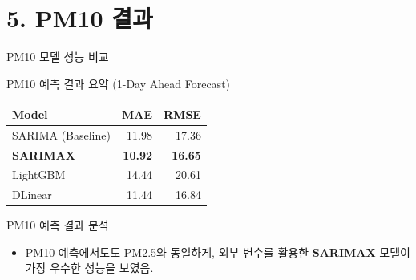 \documentclass[serif, aspectratio=169]{beamer}
\begin{document}
\section{5. PM10 결과}
\begin{frame}{PM10 모델 성능 비교}
    \begin{block}{\small PM10 예측 결과 요약 (1-Day Ahead Forecast)}
        \begin{center}
        \scriptsize
        \begin{tabular}{lrr}
        \toprule
        \textbf{Model} & \textbf{MAE} & \textbf{RMSE} \\
        \midrule
        SARIMA (Baseline) & 11.98 & 17.36 \\
        \textbf{SARIMAX} & \textbf{10.92} & \textbf{16.65} \\
        LightGBM & 14.44 & 20.61 \\
        DLinear & 11.44 & 16.84 \\
        \bottomrule
        \end{tabular}
        \end{center}
    \end{block}
    
    \begin{block}{\small PM10 예측 결과 분석}
        \begin{itemize}
            \item \scriptsize PM10 예측에서도도 PM2.5와 동일하게, 외부 변수를 활용한 \textbf{SARIMAX} 모델이 가장 우수한 성능을 보였음.
        \end{itemize}
    \end{block}
\end{frame}

\end{document}
